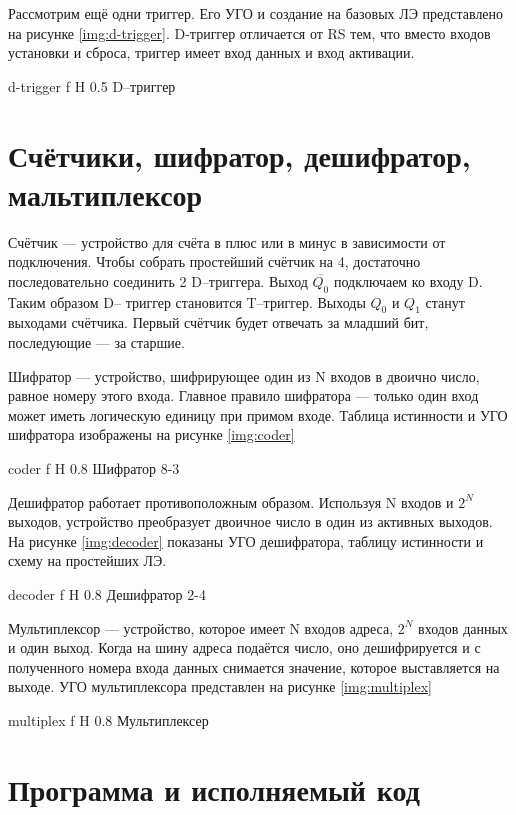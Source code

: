 \documentclass{bmstu}
\begin{document}
Рассмотрим ещё одни триггер. 
Его УГО и создание на базовых ЛЭ представлено на рисунке \ref{img:d-trigger}.
D-триггер отличается от RS тем, что вместо входов установки и сброса, триггер имеет вход данных и вход активации.

    {d-trigger}
    {f}
    {H}
    {0.5\textwidth}
    {D--триггер}

\section{Счётчики, шифратор, дешифратор, мальтиплексор}

Счётчик --- устройство для счёта в плюс или в минус в зависимости от подключения.
Чтобы собрать простейший счётчик на 4, достаточно последовательно соединить 2 D--триггера. 
Выход $\overline{Q_0}$ подключаем ко входу D.
Таким образом D-- триггер становится T--триггер.
Выходы $Q_0$ и $Q_1$ станут выходами счётчика.
Первый счётчик будет отвечать за младший бит, последующие --- за старшие.

Шифратор --- устройство, шифрирующее один из N входов в двоично число, равное номеру этого входа.
Главное правило шифратора --- только один вход может иметь логическую единицу при примом входе.
Таблица истинности и УГО шифратора изображены на рисунке \ref{img:coder}

    {coder}
    {f}
    {H}
    {0.8\textwidth}
    {Шифратор 8-3}

Дешифратор работает противоположным образом. 
Используя N входов и $2^N$ выходов, устройство преобразует двоичное число в один из активных выходов.
На рисунке \ref{img:decoder} показаны УГО дешифратора, таблицу истинности и схему на простейших ЛЭ.

    {decoder}
    {f}
    {H}
    {0.8\textwidth}
    {Дешифратор 2-4}

Мультиплексор --- устройство, которое имеет N входов адреса, $2^N$ входов данных и один выход.
Когда на шину адреса подаётся число, оно дешифрируется и с полученного номера входа данных снимается значение, которое выставляется на выходе.
УГО мультиплексора представлен на рисунке \ref{img:multiplex}

    {multiplex}
    {f}
    {H}
    {0.8\textwidth}
    {Мультиплексер}

\section{Программа и исполняемый код}
\end{document}
